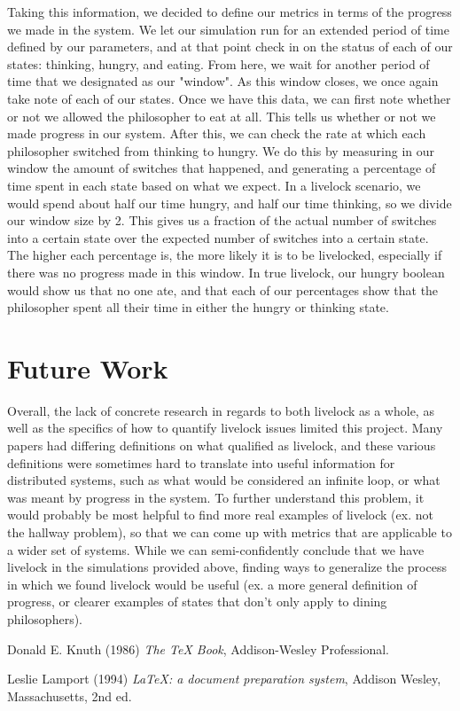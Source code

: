 \documentclass{article}
\begin{document}
Taking this information, we decided to define our metrics in terms of the progress we made in the system.  We let our simulation run 
for an extended period of time defined by our parameters, and at that point check in on the status of each of our states: thinking, 
hungry, and eating.  From here, we wait for another period of time that we designated as our "window". As this window closes, we once 
again take note of each of our states.  Once we have this data, we can first note whether or not we allowed the philosopher to eat at all.  
This tells us whether or not we made progress in our system.  After this, we can check the rate at which each philosopher switched from 
thinking to hungry.  We do this by measuring in our window the amount of switches that happened, and generating a percentage of time spent 
in each state based on what we expect.  In a livelock scenario, we would spend about half our time hungry, and half our time thinking, so 
we divide our window size by 2.  This gives us a fraction of the actual number of switches into a certain state over the expected number of 
switches into a certain state.  The higher each percentage is, the more likely it is to be livelocked, especially if there was no progress 
made in this window.  In true livelock, our hungry boolean would show us that no one ate, and that each of our percentages show that the 
philosopher spent all their time in either the hungry or thinking state.


\section{Future Work} %
Overall, the lack of concrete research in regards to both livelock as a whole, as well as the specifics of how to quantify 
livelock issues limited this project.  Many papers had differing definitions on what qualified as livelock, and these various 
definitions were sometimes hard to translate into useful information for distributed systems, such as what would be considered 
an infinite loop, or what was meant by progress in the system.  To further understand this problem, it would probably be most 
helpful to find more real examples of livelock (ex. not the hallway problem), so that we can come up with metrics that are 
applicable to a wider set of systems.  While we can semi-confidently conclude that we have livelock in the simulations provided 
above, finding ways to generalize the process in which we found livelock would be useful  (ex. a more general definition of progress, 
or clearer examples of states that don't only apply to dining philosophers).

\begin{thebibliography}{9}
Donald E. Knuth (1986) \emph{The \TeX{} Book}, Addison-Wesley Professional.

Leslie Lamport (1994) \emph{\LaTeX: a document preparation system}, Addison
Wesley, Massachusetts, 2nd ed.
\end{thebibliography}
\end{document}
